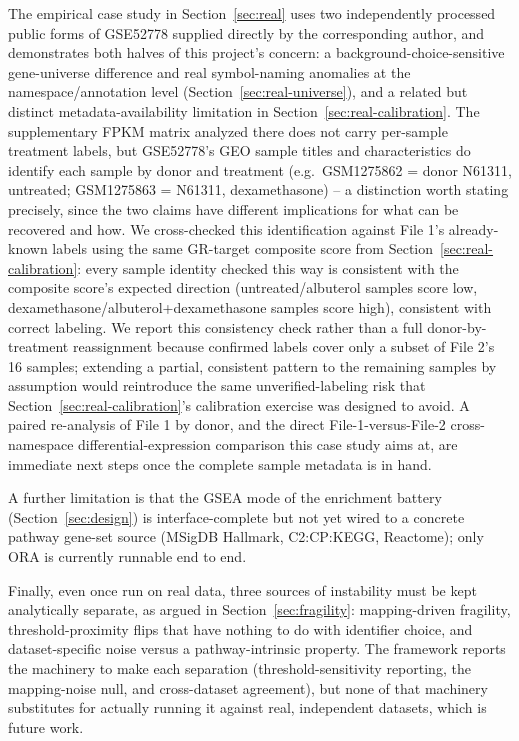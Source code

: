 \documentclass[webpdf,contemporary,large]{oup-authoring-template}
\theoremstyle{thmstyleone}%
\theoremstyle{thmstyletwo}%
\theoremstyle{thmstylethree}%
\begin{document}
The empirical case study in Section~\ref{sec:real} uses two independently processed public forms of GSE52778 supplied directly by the corresponding author, and demonstrates both halves of this project's concern: a background-choice-sensitive gene-universe difference and real symbol-naming anomalies at the namespace/annotation level (Section~\ref{sec:real-universe}), and a related but distinct metadata-availability limitation in Section~\ref{sec:real-calibration}. The supplementary FPKM matrix analyzed there does not carry per-sample treatment labels, but GSE52778's GEO sample titles and characteristics do identify each sample by donor and treatment (e.g.\ GSM1275862 = donor N61311, untreated; GSM1275863 = N61311, dexamethasone) -- a distinction worth stating precisely, since the two claims have different implications for what can be recovered and how. We cross-checked this identification against File 1's already-known labels using the same GR-target composite score from Section~\ref{sec:real-calibration}: every sample identity checked this way is consistent with the composite score's expected direction (untreated/albuterol samples score low, dexamethasone/albuterol+dexamethasone samples score high), consistent with correct labeling. We report this consistency check rather than a full donor-by-treatment reassignment because confirmed labels cover only a subset of File 2's 16 samples; extending a partial, consistent pattern to the remaining samples by assumption would reintroduce the same unverified-labeling risk that Section~\ref{sec:real-calibration}'s calibration exercise was designed to avoid. A paired re-analysis of File 1 by donor, and the direct File-1-versus-File-2 cross-namespace differential-expression comparison this case study aims at, are immediate next steps once the complete sample metadata is in hand.

A further limitation is that the GSEA mode of the enrichment battery (Section~\ref{sec:design}) is interface-complete but not yet wired to a concrete pathway gene-set source (MSigDB Hallmark, C2:CP:KEGG, Reactome); only ORA is currently runnable end to end.

Finally, even once run on real data, three sources of instability must be kept analytically separate, as argued in Section~\ref{sec:fragility}: mapping-driven fragility, threshold-proximity flips that have nothing to do with identifier choice, and dataset-specific noise versus a pathway-intrinsic property. The framework reports the machinery to make each separation (threshold-sensitivity reporting, the mapping-noise null, and cross-dataset agreement), but none of that machinery substitutes for actually running it against real, independent datasets, which is future work.
\end{document}
